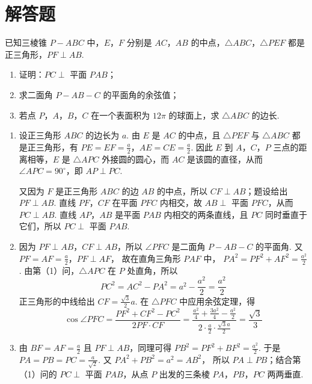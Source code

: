 \section{解答题}
\begin{problem}
已知三棱锥 \(P-ABC\) 中，\(E\)，\(F\) 分别是 \(AC\)，\(AB\) 的中点，\(\triangle ABC\)，\(\triangle PEF\) 都是正三角形，\(PF \perp AB\).

\begin{enumerate}
\item 证明：\(PC \perp\) 平面 \(PAB\)；
\item 求二面角 \(P-AB-C\) 的平面角的余弦值；
\item 若点 \(P\)，\(A\)，\(B\)，\(C\) 在一个表面积为 \(12\pi\) 的球面上，求 \(\triangle ABC\) 的边长.
\end{enumerate}


\begin{solution}
\begin{enumerate}
\item 设正三角形 \(ABC\) 的边长为 \(a\). 由 \(E\) 是 \(AC\) 的中点，且 \(\triangle PEF\) 与 \(\triangle ABC\) 都是正三角形，有
\(PE=EF=\frac a2\)，\(AE=CE=\frac a2\).
因此 \(E\) 到 \(A\)，\(C\)，\(P\) 三点的距离相等，\(E\) 是 \(\triangle APC\) 外接圆的圆心，而 \(AC\) 是该圆的直径，从而 \(\angle APC=90^\circ\)，即 \(AP\perp PC\).

又因为 \(F\) 是正三角形 \(ABC\) 的边 \(AB\) 的中点，所以 \(CF\perp AB\)；题设给出 \(PF\perp AB\). 直线 \(PF\)，\(CF\) 在平面 \(PFC\) 内相交，故 \(AB\perp\) 平面 \(PFC\)，从而 \(PC\perp AB\). 直线 \(AP\)，\(AB\) 是平面 \(PAB\) 内相交的两条直线，且 \(PC\) 同时垂直于它们，所以 \(PC\perp\) 平面 \(PAB\).

\item 因为 \(PF\perp AB\)，\(CF\perp AB\)，所以 \(\angle PFC\) 是二面角 \(P-AB-C\) 的平面角. 又
\(PF=AF=\frac a2\)，\(PF\perp AF\)，
故在直角三角形 \(PAF\) 中，
\(PA^2=PF^2+AF^2=\frac{a^2}{2}\).
由第（1）问，\(\triangle APC\) 在 \(P\) 处直角，所以
\[
PC^2=AC^2-PA^2=a^2-\frac{a^2}{2}=\frac{a^2}{2}
\]
正三角形的中线给出 \(CF=\frac{\sqrt3}{2}a\). 在 \(\triangle PFC\) 中应用余弦定理，得
\[
\cos\angle PFC
=\frac{PF^2+CF^2-PC^2}{2PF\cdot CF}
=\frac{\frac{a^2}{4}+\frac{3a^2}{4}-\frac{a^2}{2}}{2\cdot\frac a2\cdot\frac{\sqrt3 a}{2}}
=\frac{\sqrt3}{3}
\]

\item 由 \(BF=AF=\frac a2\) 且 \(PF\perp AB\)，同理可得
\(PB^2=PF^2+BF^2=\frac{a^2}{2}\).
于是 \(PA=PB=PC=\frac{a}{\sqrt2}\). 又
\(PA^2+PB^2=a^2=AB^2\)，
所以 \(PA\perp PB\)；结合第（1）问的 \(PC\perp\) 平面 \(PAB\)，从点 \(P\) 出发的三条棱 \(PA\)，\(PB\)，\(PC\) 两两垂直.


\end{enumerate}
\end{solution}
\end{problem}
